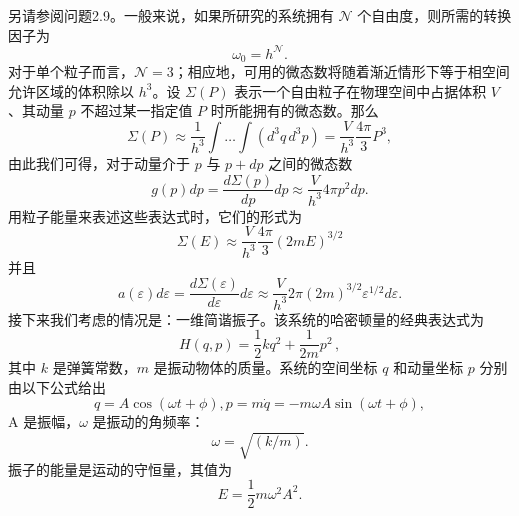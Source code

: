 另请参阅问题2.9。一般来说，如果所研究的系统拥有 \(\mathcal{N}\) 个自由度，则所需的转换因子为
\begin{equation}\tag{2.3.15}\label{eq:2.3.15}
\omega _ { 0 } = h ^{\mathcal { N} } .
\end{equation}
对于单个粒子而言，\(\mathcal{N}=3\)；相应地，可用的微态数将随着渐近情形下等于相空间允许区域的体积除以 \(h^{3}\)。设 \(\Sigma(P)\) 表示一个自由粒子在物理空间中占据体积 \(V\)、其动量 \(p\) 不超过某一指定值 \(P\) 时所能拥有的微态数。那么
\begin{equation}\tag{2.3.16}\label{eq:2.3.16}
\Sigma ( P ) \approx \frac { 1 } { h ^{3} } \int \ldots \int \left( d ^{3} q \, d ^{3} p \right) = \frac { V } { h ^{3} } \frac { 4 \pi } { 3 } P ^{3} ,
\end{equation}
由此我们可得，对于动量介于 \(p\) 与 \(p+dp\) 之间的微态数
\begin{equation}\tag{2.3.17}\label{eq:2.3.17}
g ( p ) d p = \frac { d \Sigma ( p ) } { d p } d p \approx \frac { V } { h ^{3} } 4 \pi p ^{2} d p .
\end{equation}
用粒子能量来表述这些表达式时，它们的形式为
\begin{equation}\tag{2.3.18}\label{eq:2.3.18}
\Sigma \left( E \right) \approx \frac { V } { h ^{3} } \frac { 4 \pi } { 3 } ( 2 m E ) ^{3 / 2}
\end{equation}
并且
\begin{equation}\tag{2.3.19}\label{eq:2.3.19}
a ( \varepsilon ) d \varepsilon = \frac { d \Sigma ( \varepsilon ) } { d \varepsilon } d \varepsilon \approx \frac { V } { h ^{3} } 2 \pi ( 2 m ) ^{3 / 2} \varepsilon ^{1 / 2} d \varepsilon .
\end{equation}
接下来我们考虑的情况是：一维简谐振子。该系统的哈密顿量的经典表达式为
\begin{equation}\tag{2.3.20}\label{eq:2.3.20}
H ( q , p ) = \frac { 1 } { 2 } k q ^{2} + \frac { 1 } { 2 m } p ^{2} \, ,
\end{equation}
其中 \(k\) 是弹簧常数，\(m\) 是振动物体的质量。系统的空间坐标 \(q\) 和动量坐标 \(p\) 分别由以下公式给出
\begin{equation}\tag{2.3.21}\label{eq:2.3.21}
q = A \cos ( \omega t + \phi ) ,  p = m \dot { q } = - m \omega A \sin ( \omega t + \phi ) ,
\end{equation}
A 是振幅，\(\omega\) 是振动的角频率：
\begin{equation}\tag{2.3.22}\label{eq:2.3.22}
\omega = \sqrt { ( k / m ) } .
\end{equation}
振子的能量是运动的守恒量，其值为
\begin{equation}\tag{2.3.23}\label{eq:2.3.23}
E = \frac { 1 } { 2 } m \omega ^{2} A ^{2} .
\end{equation}
